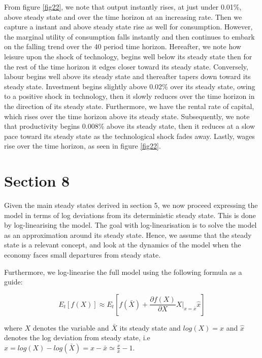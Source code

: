 \documentclass[
  11pt,
  justified]{article}
\begin{document}
From figure \ref{fig22}, we note that output instantly rises, at just
under 0.01\%, above steady state and over the time horizon at an
increasing rate. Then we capture a instant and above steady state rise
as well for consumption. However, the marginal utility of consumption
falls instantly and then continues to embark on the falling trend over
the 40 period time horizon. Hereafter, we note how leisure upon the
shock of technology, begins well below its steady state then for the
rest of the time horizon it edges closer toward its steady state.
Conversely, labour begins well above its steady state and thereafter
tapers down toward its steady state. Investment begins slightly above
0.02\% over its steady state, owing to a positive shock in technology,
then it slowly reduces over the time horizon in the direction of its
steady state. Furthermore, we have the rental rate of capital, which
rises over the time horizon above its steady state. Subsequently, we
note that productivity begins 0.008\% above its steady state, then it
reduces at a slow pace toward its steady state as the technological
shock fades away. Lastly, wages rise over the time horizon, as seen in
figure \ref{fig22}.

\hypertarget{section-8}{%
\section{Section 8}\label{section-8}}

Given the main steady states derived in section 5, we now proceed
expressing the model in terms of log deviations from its deterministic
steady state. This is done by log-linearising the model. The goal with
log-linearisation is to solve the model as an approximation around its
steady state. Hence, we assume that the steady state is a relevant
concept, and look at the dynamics of the model when the economy faces
small departures from steady state.

Furthermore, we log-linearise the full model using the following formula
as a guide:

\begin{equation}
E_{t} [f(X)] \approx E_{t} [f(\bar X) + \frac{\partial f(X)}{\partial X}  X |_{x = \bar x} \hat x]
\label{eq:formula}
\end{equation}

where \(X\) denotes the variable and \(\bar X\) its steady state and
\(log(X) = x\) and \(\hat x\) denotes the log deviation from steady
state, i.e
\(\hat x = log(X) - log(\bar X) = x - \bar x \simeq \frac{x}{ \bar{x}} - 1\).
\end{document}
